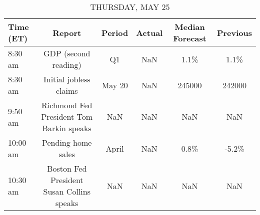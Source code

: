 \documentclass{article}%
\begin{document}
%


\begin{table}[htbp]%
\caption{THURSDAY, MAY 25}%
\centering%
\begin{adjustbox}{width=1\textwidth}%
\begin{tabular}{lccccc}
\toprule
Time (ET) &                                    Report & Period & Actual & Median Forecast & Previous \\
\midrule
  8:30 am &                      GDP (second reading) &     Q1 &    NaN &            1.1\% &     1.1\% \\
  8:30 am &                    Initial jobless claims & May 20 &    NaN &          245000 &   242000 \\
  9:50 am &  Richmond Fed President Tom Barkin speaks &    NaN &    NaN &             NaN &      NaN \\
 10:00 am &                        Pending home sales &  April &    NaN &            0.8\% &    -5.2\% \\
 10:30 am & Boston Fed President Susan Collins speaks &    NaN &    NaN &             NaN &      NaN \\
\bottomrule
\end{tabular}
%
\end{adjustbox}%
\end{table}

%
\end{document}
